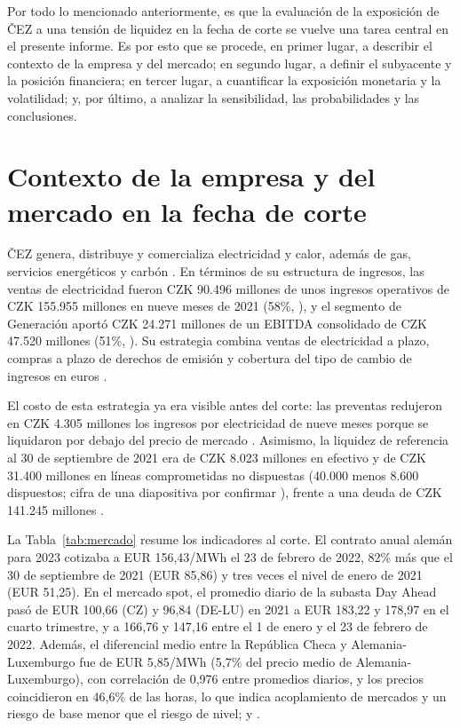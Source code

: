 \documentclass[11pt,letterpaper]{article}
\theoremstyle{plain}
\theoremstyle{definition}
\theoremstyle{remark}
\numberwithin{equation}{section}
\begin{document}
Por todo lo mencionado anteriormente, es que la evaluación de la exposición de ČEZ a una tensión de liquidez en la fecha de corte se vuelve una tarea central en el presente informe. Es por esto que se procede, en primer lugar, a describir el contexto de la empresa y del mercado; en segundo lugar, a definir el subyacente y la posición financiera; en tercer lugar, a cuantificar la exposición monetaria y la volatilidad; y, por último, a analizar la sensibilidad, las probabilidades y las conclusiones.

\section{Contexto de la empresa y del mercado en la fecha de corte}

ČEZ genera, distribuye y comercializa electricidad y calor, además de gas, servicios energéticos y carbón \parencite[p.~10]{cez_interim_q3_2021}. En términos de su estructura de ingresos, las ventas de electricidad fueron CZK 90.496 millones de unos ingresos operativos de CZK 155.955 millones en nueve meses de 2021 (58\%, \parencite[p.~21]{cez_interim_q3_2021}), y el segmento de Generación aportó CZK 24.271 millones de un EBITDA consolidado de CZK 47.520 millones (51\%, \parencite[pp.~24--25]{cez_interim_q3_2021}). Su estrategia combina ventas de electricidad a plazo, compras a plazo de derechos de emisión y cobertura del tipo de cambio de ingresos en euros \parencite{cez_q3_2021}.

El costo de esta estrategia ya era visible antes del corte: las preventas redujeron en CZK 4.305 millones los ingresos por electricidad de nueve meses porque se liquidaron por debajo del precio de mercado \parencite[p.~21]{cez_interim_q3_2021}. Asimismo, la liquidez de referencia al 30 de septiembre de 2021 era de CZK 8.023 millones en efectivo \parencite[p.~2]{cez_interim_q3_2021} y de CZK 31.400 millones en líneas comprometidas no dispuestas (40.000 menos 8.600 dispuestos; cifra de una diapositiva por confirmar \parencite{cez_q3_2021}), frente a una deuda de CZK 141.245 millones \parencite[pp.~3, 19, 20]{cez_interim_q3_2021}.

La Tabla~\ref{tab:mercado} resume los indicadores al corte. El contrato anual alemán para 2023 cotizaba a EUR 156,43/MWh el 23 de febrero de 2022, 82\% más que el 30 de septiembre de 2021 (EUR 85,86) y tres veces el nivel de enero de 2021 (EUR 51,25). En el mercado spot, el promedio diario de la subasta Day Ahead pasó de EUR 100,66 (CZ) y 96,84 (DE-LU) en 2021 a EUR 183,22 y 178,97 en el cuarto trimestre, y a 166,76 y 147,16 entre el 1 de enero y el 23 de febrero de 2022. Además, el diferencial medio entre la República Checa y Alemania-Luxemburgo fue de EUR 5,85/MWh (5,7\% del precio medio de Alemania-Luxemburgo), con correlación de 0,976 entre promedios diarios, y los precios coincidieron en 46,6\% de las horas, lo que indica acoplamiento de mercados y un riesgo de base menor que el riesgo de nivel; \textcite{entsoe_sdac} y \textcite{ote_market_coupling}.
\end{document}
